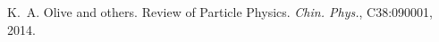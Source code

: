 
\begin{DoxyDescription}
\item[\label{citelist_CITEREF_PDGlist}%
\Hypertarget{citelist_CITEREF_PDGlist}%
\mbox{[}1\mbox{]}]K.~A. Olive and others. Review of Particle Physics. {\itshape Chin. Phys.}, C38\+:090001, 2014. 


\end{DoxyDescription}